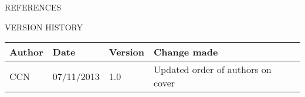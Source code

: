 \documentclass{article}
\newcommand{\versionhistory}{
		\begin{tabularx}{\linewidth}{| p{2cm} | p{2cm} | p{2cm} | X | }
			\hline
			\bf{Author} & \bf{Date} & \bf{Version} & \bf{Change made} \\
			\hline
			CCN & 07/11/2013 & 1.0 & Updated order of authors on cover \\
			\hline
		\end{tabularx}
}
\begin{document}
	\nocite{LaTeXTemplate} %

	\newpage
	\begin{section}{REFERENCES}
		
		
	\end{section}
	
	\vspace{1cm}
	\begin{section}{VERSION HISTORY}
		\versionhistory
	\end{section}
\end{document}
